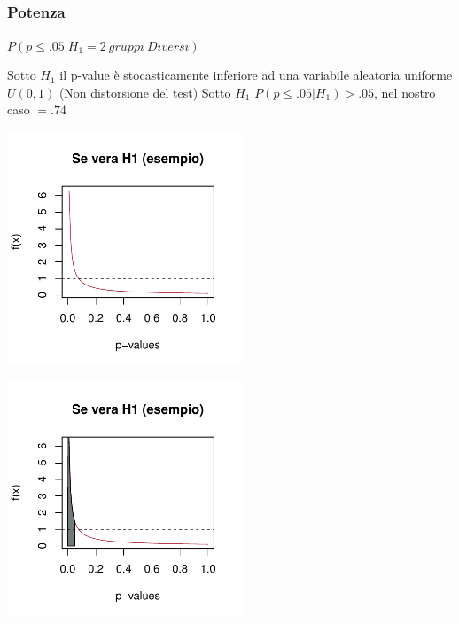 \documentclass[xcolor={pdftex,dvipsnames,table}]{beamer}
\begin{document}
\subsection{}
\begin{frame}
\frametitle{Potenza}

$P(p\leq .05 | H_1=2\ gruppi\ Diversi)$
\begin{overprint}
 {\small Sotto $H_1$ il p-value \`e stocasticamente inferiore ad una variabile aleatoria uniforme $U(0,1)$ (Non distorsione del test)}
 {Sotto $H_1$ $P(p\leq .05 |H_1)>.05$, nel nostro caso $= .74$\\ }
\end{overprint}
\begin{overprint} 
 \centerline{\includegraphics[width=7cm]{plaatjes/beta1}}
 \centerline{\includegraphics[width=7cm]{plaatjes/beta2}}
\end{overprint} 
\end{frame}
\end{document}

